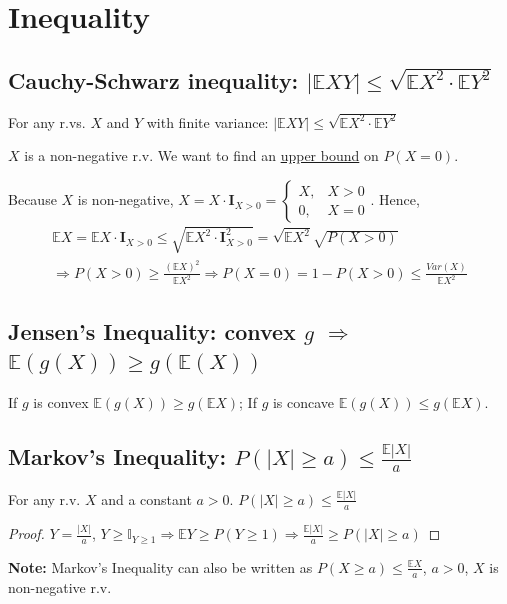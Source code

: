 \documentclass[11pt]{elegantbook}
\begin{document}
\section{Inequality}
\subsection{Cauchy-Schwarz inequality: $|\mathbb{E}XY|\leq \sqrt{\mathbb{E}X^2\cdot \mathbb{E}Y^2}$}
For any r.vs. $X$ and $Y$ with finite variance: $|\mathbb{E}XY|\leq \sqrt{\mathbb{E}X^2\cdot \mathbb{E}Y^2}$
\begin{example}
$X$ is a non-negative r.v. We want to find an \underline{upper bound} on $P(X=0)$.
\end{example}
Because $X$ is non-negative, $X=X\cdot \textbf{I}_{X>0}=\left\{\begin{matrix}
    X,&X>0\\
    0,&X=0
\end{matrix}\right.$. Hence,
\begin{equation}
    \begin{aligned}
        \mathbb{E}X= \mathbb{E}X\cdot \textbf{I}_{X>0}\leq \sqrt{\mathbb{E} X^2\cdot \textbf{I}^2_{X>0}}=\sqrt{\mathbb{E}X^2}\sqrt{P(X>0)}\\
        \Rightarrow P(X>0)\geq\frac{(\mathbb{E}X)^2}{\mathbb{E}X^2} \Rightarrow P(X=0)=1-P(X>0)\leq \frac{Var(X)}{\mathbb{E}X^2}
    \end{aligned}
    \nonumber
\end{equation}

\subsection{Jensen's Inequality: convex $g$ $\Rightarrow$ $\mathbb{E}(g(X))\geq g(\mathbb{E}(X))$}
If $g$ is convex $\mathbb{E}(g(X))\geq g(\mathbb{E}X)$; If $g$ is concave $\mathbb{E}(g(X))\leq g(\mathbb{E}X)$.

\subsection{Markov's Inequality: $P(|X|\geq a)\leq \frac{\mathbb{E}|X|}{a}$}
For any r.v. $X$ and a constant $a>0$. $P(|X|\geq a)\leq \frac{\mathbb{E}|X|}{a}$
\begin{proof}
$Y=\frac{|X|}{a}$, $Y\geq \mathbb{I}_{Y\geq 1} \Rightarrow \mathbb{E}Y\geq P(Y\geq 1) \Rightarrow \frac{\mathbb{E}|X|}{a}\geq P(|X|\geq a)$
\end{proof}
\textbf{Note:} Markov's Inequality can also be written as $P(X\geq a)\leq \frac{\mathbb{E}X}{a}$, $a>0$, $X$ is non-negative r.v.
\end{document}
